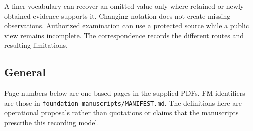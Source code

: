\documentclass[11pt,a4paper]{article}
\begin{document}
A finer vocabulary can recover an omitted value only where retained or newly obtained evidence supports it. Changing notation does not create missing observations. Authorized examination can use a protected source while a public view remains incomplete. The correspondence records the different routes and resulting limitations.
\subsection{General}

Page numbers below are one-based pages in the supplied PDFs. FM identifiers are those in \texttt{foundation\_manuscripts/MANIFEST.md}. The definitions here are operational proposals rather than quotations or claims that the manuscripts prescribe this recording model.
\end{document}
